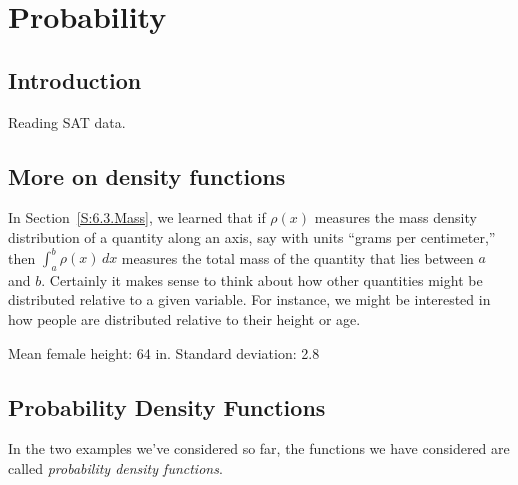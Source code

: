 \section{Probability} \label{S:6.6.Prob}

\vspace*{-14 pt}

\subsection*{Introduction}

Reading SAT data.



\subsection*{More on density functions} 

In Section~\ref{S:6.3.Mass}, we learned that if $\rho(x)$ measures the mass density distribution of a quantity along an axis, say with units ``grams per centimeter,'' then $\int_a^b \rho(x) \, dx$ measures the total mass of the quantity that lies between $a$ and $b$.  Certainly it makes sense to think about how other quantities might be distributed relative to a given variable.  For instance, we might be interested in how people are distributed relative to their height or age.  

Mean female height: 64 in.
Standard deviation: 2.8




\subsection*{Probability Density Functions} 


\nin In the two examples we've considered so far, the functions we have considered are called \emph{probability density functions}.

